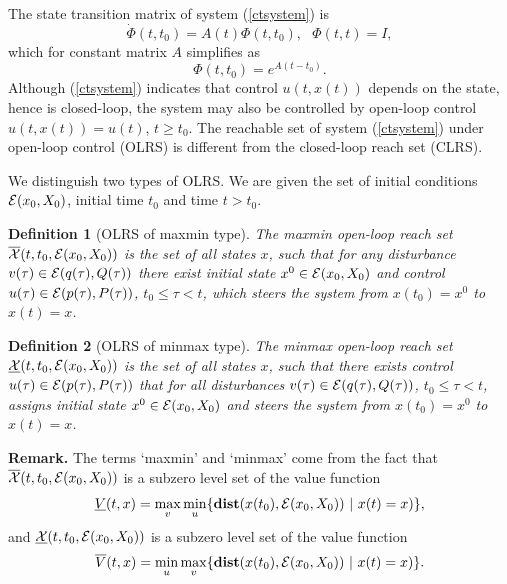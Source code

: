 \documentclass{report}
\newtheorem{df}{Definition}[section]
\newcommand{\bd}{\begin{df}}
\newcommand{\ed}{\end{df}}
\newcommand{\EE}{{\cal E}}
\newcommand{\XX}{{\cal X}}
\begin{document}
The state transition matrix of system (\ref{ctsystem}) is
\[ \dot{\Phi}(t, t_0) = A(t)\Phi(t, t_0), ~~~ \Phi(t,t)=I, \]
which for constant matrix $A$ simplifies as
\[ \Phi(t,t_0) = e^{A(t-t_0)} .\]
Although (\ref{ctsystem}) indicates that control $u(t,x(t))$ depends on the
state, hence is closed-loop, the system may also be controlled by open-loop
control $u(t,x(t))=u(t)$, $t\geq t_0$.
The reachable set of system (\ref{ctsystem}) under open-loop control (OLRS)
is different from the closed-loop reach set (CLRS).

We distinguish two types of OLRS.  We are
given the set of initial conditions $\EE(x_0,X_0)$, initial time $t_0$ and
time $t>t_0$.
\bd[OLRS of maxmin type] The
maxmin open-loop reach set $\overline{\XX}(t,t_0,\EE(x_0,X_0))$
is the set of all states $x$, such
that for any disturbance $v(\tau)\in\EE(q(\tau),Q(\tau))$ there exist
initial state $x^0\in\EE(x_0,X_0)$ and control $u(\tau)\in\EE(p(\tau),P(\tau))$,
$t_0\leq\tau<t$,
which steers the system from $x(t_0)=x^0$ to $x(t)=x$.
\ed
\bd[OLRS of minmax type] The
minmax open-loop reach set $\underline{\XX}(t,t_0,\EE(x_0,X_0))$
is the set of all states $x$, such
that there exists control $u(\tau)\in\EE(p(\tau),P(\tau))$ that for all
disturbances $v(\tau)\in\EE(q(\tau),Q(\tau))$,
$t_0\leq\tau<t$, assigns initial state
$x^0\in\EE(x_0,X_0)$ and steers the system from $x(t_0)=x^0$ to $x(t)=x$.
\ed


{\bf Remark.} The terms `maxmin' and `minmax' come from the fact that
$\overline{\XX}(t,t_0,\EE(x_0,X_0))$ is a subzero level set of the value
function
\[ \underline{V}(t,x) =
\max_v\min_u\{{\bf dist}(x(t_0),\EE(x_0,X_0)) ~|~ x(t)=x)\}, \]
and $\underline{\XX}(t,t_0,\EE(x_0,X_0))$ is a subzero level set of the value
function
\[ \overline{V}(t,x) =
\min_u\max_v\{{\bf dist}(x(t_0),\EE(x_0,X_0)) ~|~ x(t)=x)\}. \]
\end{document}
